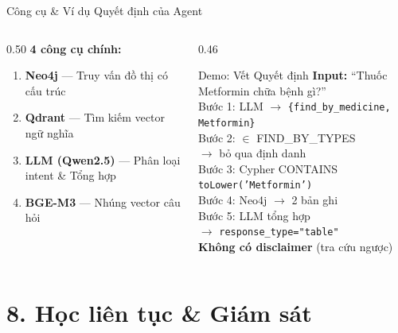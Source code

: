 \documentclass[aspectratio=169, 11pt]{beamer}
\begin{document}
\begin{frame}{Công cụ \& Ví dụ Quyết định của Agent}
  \begin{columns}[t]
    \begin{column}{0.50\textwidth}
      \textbf{4 công cụ chính:}
      \begin{enumerate}
        \scriptsize
        \item \textbf{Neo4j} --- Truy vấn đồ thị có cấu trúc
        \item \textbf{Qdrant} --- Tìm kiếm vector ngữ nghĩa
        \item \textbf{LLM (Qwen2.5)} --- Phân loại intent \& Tổng hợp
        \item \textbf{BGE-M3} --- Nhúng vector câu hỏi
      \end{enumerate}
    \end{column}
    \begin{column}{0.46\textwidth}
      \begin{exampleblock}{Demo: Vết Quyết định}
        \scriptsize
        \textbf{Input:} ``Thuốc Metformin chữa bệnh gì?''\\[3pt]
        Bước 1: LLM $\to$ \texttt{\{find\_by\_medicine,}\\
        \quad\texttt{Metformin\}}\\[2pt]
        Bước 2: $\in$ FIND\_BY\_TYPES\\
        $\to$ bỏ qua định danh\\[2pt]
        Bước 3: Cypher CONTAINS\\
        \texttt{toLower('Metformin')}\\[2pt]
        Bước 4: Neo4j $\to$ 2 bản ghi\\[2pt]
        Bước 5: LLM tổng hợp\\
        $\to$ \texttt{response\_type="table"}\\
        \textbf{Không có disclaimer} (tra cứu ngược)
      \end{exampleblock}
    \end{column}
  \end{columns}
\end{frame}

\section{8. Học liên tục \& Giám sát}
\end{document}
